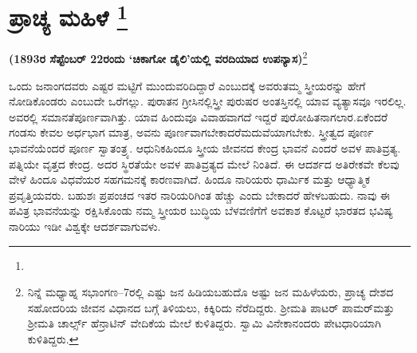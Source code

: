 
\chapter[ಪ್ರಾಚ್ಯ ಮಹಿಳೆ ]{ಪ್ರಾಚ್ಯ ಮಹಿಳೆ \protect\footnote{}}

\centerline{\textbf{(1893ರ ಸೆಪ್ಟೆಂಬರ್​ 22ರಂದು ‘ಚಿಕಾಗೋ ಡೈಲಿ’ಯಲ್ಲಿ ವರದಿಯಾದ ಉಪನ್ಯಾಸ)}\footnote{ ನಿನ್ನೆ ಮಧ್ಯಾಹ್ನ ಸಭಾಂಗಣ–7ರಲ್ಲಿ ಎಷ್ಟು ಜನ ಹಿಡಿಯಬಹುದೊ ಅಷ್ಟು ಜನ ಮಹಿಳೆಯರು, ಪ್ರಾಚ್ಯ ದೇಶದ ಸಹೋದರಿಯ ಜೀವನ ವಿಧಾನದ ಬಗ್ಗೆ ತಿಳಿಯಲು, ಕಿಕ್ಕಿರಿದು ನೆರೆದಿದ್ದರು. ಶ‍್ರೀಮತಿ ಪಾಟರ್​ ಪಾಮರ್​ ಮತ್ತು ಶ‍್ರೀಮತಿ ಚಾರ್ಲ್ಸ್​ ಹೆನ್ರಾಟಿನ್​ ವೇದಿಕೆಯ ಮೇಲೆ ಕುಳಿತಿದ್ದರು. ಸ್ವಾಮಿ ವಿನೇಕಾನಂದರು ಪೇಟಧಾರಿಯಾಗಿ ಕುಳಿತಿದ್ದರು.}}

\vskip 0.5cm

ಒಂದು ಜನಾಂಗದವರು ಎಷ್ಟರ ಮಟ್ಟಿಗೆ ಮುಂದುವರಿದಿದ್ದಾರೆ ಎಂಬುದಕ್ಕೆ ಅವರು\break ತಮ್ಮ ಸ್ತ್ರೀಯರನ್ನು ಹೇಗೆ ನೋಡಿಕೊಂಡರು ಎಂಬುದೇ ಒರೆಗಲ್ಲು. ಪುರಾತನ ಗ್ರೀಸಿನಲ್ಲಿ\break ಸ್ತ್ರೀ ಪುರುಷರ ಅಂತಸ್ತಿನಲ್ಲಿ ಯಾವ ವ್ಯತ್ಯಾಸವೂ ಇರಲಿಲ್ಲ. ಅವರಲ್ಲಿ ಸಮಾನತೆ\break ಪೂರ್ಣವಾಗಿತ್ತು. ಯಾವ ಹಿಂದುವೂ ವಿವಾಹವಾಗದೆ ಇದ್ದರೆ ಪುರೋಹಿತನಾಗಲಾರ.\break ಏಕೆಂದರೆ ಗಂಡಸು ಕೇವಲ ಅರ್ಧಭಾಗ ಮಾತ್ರ, ಅವನು ಪೂರ್ಣವಾಗಬೇಕಾದರೆ\break ಮದುವೆಯಾಗಬೇಕು. ಸ್ತ್ರೀತ್ವದ ಪೂರ್ಣ ಭಾವನೆಯೆಂದರೆ ಪೂರ್ಣ ಸ್ವಾತಂತ್ರ್ಯ. ಆಧುನಿಕ\break ಹಿಂದೂ ಸ್ತ್ರೀಯ ಜೀವನದ ಕೇಂದ್ರ ಭಾವನೆ ಎಂದರೆ ಅವಳ ಪಾತಿವ್ರತ್ಯ. ಪತ್ನಿಯೇ ವೃತ್ತದ ಕೇಂದ್ರ. ಅದರ ಸ್ಥಿರತೆಯೇ ಅವಳ ಪಾತಿವ್ರತ್ಯದ ಮೇಲೆ ನಿಂತಿದೆ. ಈ ಆದರ್ಶದ ಅತಿರೇಕವೇ ಕೆಲವು ವೇಳೆ ಹಿಂದೂ ವಿಧವೆಯರ ಸಹಗಮನಕ್ಕೆ ಕಾರಣವಾಗಿದೆ. ಹಿಂದೂ ನಾರಿಯರು ಧಾರ್ಮಿಕ ಮತ್ತು ಆಧ್ಯಾತ್ಮಿಕ ಪ್ರವೃತ್ತಿಯವರು. ಬಹುಶಃ ಪ್ರಪಂಚದ ಇತರ ನಾರಿಯರಿಗಿಂತ ಹೆಚ್ಚು ಎಂದು ಬೇಕಾದರೆ ಹೇಳಬಹುದು. ನಾವು ಈ ಪವಿತ್ರ ಭಾವನೆಯನ್ನು ರಕ್ಷಿಸಿಕೊಂಡು ನಮ್ಮ ಸ್ತ್ರೀಯರ ಬುದ್ಧಿಯ ಬೆಳವಣಿಗೆಗೆ ಅವಕಾಶ ಕೊಟ್ಟರೆ ಭಾರತದ ಭವಿಷ್ಯ ನಾರಿಯು ಇಡೀ ವಿಶ್ವಕ್ಕೇ ಆದರ್ಶವಾಗುವಳು.

\eject

